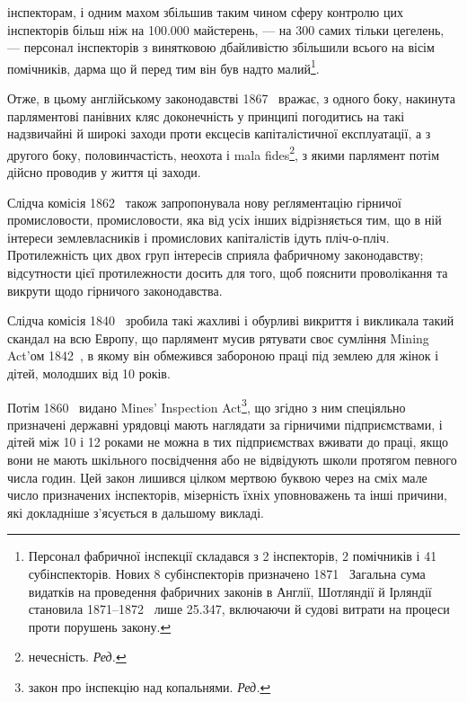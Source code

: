 \parcont{}  %
інспекторам, і одним махом збільшив таким чином сферу контролю
цих інспекторів більш ніж на \num{100.000} майстерень, — на 300 самих
тільки цегелень, — персонал інспекторів з винятковою дбайливістю
збільшили всього на вісім помічників, дарма що й перед
тим він був надто малий\footnote{
Персонал фабричної інспекції складався з 2 інспекторів, 2 помічників
і 41 субінспекторів. Нових 8 субінспекторів призначено 1871~
Загальна сума видатків на проведення фабричних законів в Англії,
Шотляндії й Ірляндії становила 1871--1872~ лише \num{25.347},
включаючи й судові витрати на процеси проти порушень закону.
}.

Отже, в цьому англійському законодавстві 1867~ вражає,
з одного боку, накинута парляментові панівних кляс доконечність
у принципі погодитись на такі надзвичайні й широкі заходи
проти ексцесів капіталістичної експлуатації, а з другого боку,
половинчастість, неохота і mala fides\footnote*{
нечесність. \emph{Ред.}
}, з якими парлямент
потім дійсно проводив у життя ці заходи.

Слідча комісія 1862~ також запропонувала нову реґляментацію
гірничої промисловости, промисловости, яка від усіх інших
відрізняється тим, що в ній інтереси землевласників і промислових
капіталістів ідуть пліч-о-пліч. Протилежність цих двох
груп інтересів сприяла фабричному законодавству; відсутности
цієї протилежности досить для того, щоб пояснити проволікання
та викрути щодо гірничого законодавства.

Слідча комісія 1840~ зробила такі жахливі і обурливі викриття
і викликала такий скандал на всю Европу, що парлямент
мусив рятувати своє сумління Mining Act’ом 1842~, в якому
він обмежився забороною праці під землею для жінок і дітей,
молодших від 10 років.

Потім 1860~ видано Mines’ Inspection Act\footnote*{
закон про інспекцію над копальнями. \emph{Ред.}
}, що згідно з ним
спеціяльно призначені державні урядовці мають наглядати за гірничими
підприємствами, і дітей між 10 і 12 роками не можна в
тих підприємствах вживати до праці, якщо вони не мають шкільного
посвідчення або не відвідують школи протягом певного
числа годин. Цей закон лишився цілком мертвою буквою через
на сміх мале число призначених інспекторів, мізерність їхніх
уповноважень та інші причини, які докладніше з’ясується в
дальшому викладі.

